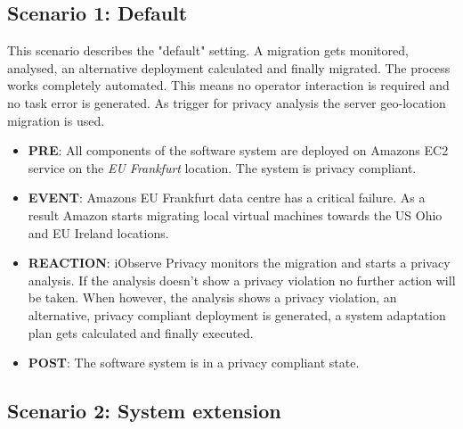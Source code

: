 \subsection{Scenario 1: Default}
\label{eval:scenario:1}
This scenario describes the "default" setting. A migration gets monitored, analysed, an alternative deployment calculated and finally migrated. The process works completely automated. This means no operator interaction is required and no task error is generated. As trigger for privacy analysis the server geo-location migration is used.
\begin{itemize}
	\setlength\itemsep{0em}
	\item \textbf{PRE}: All components of the software system are deployed on Amazons EC2 service on the \textit{EU Frankfurt} location. The system is privacy compliant.
	\item \textbf{EVENT}: Amazons EU Frankfurt data centre has a critical failure. As a result Amazon starts migrating local virtual machines towards the US Ohio and EU Ireland locations.
	\item \textbf{REACTION}: iObserve Privacy monitors the migration and starts a privacy analysis. If the analysis doesn't show a privacy violation no further action will be taken. When however, the analysis shows a privacy violation, an alternative, privacy compliant deployment is generated, a system adaptation plan gets calculated and finally executed.
	\item \textbf{POST}: The software system is in a privacy compliant state.
\end{itemize}


\subsection{Scenario 2: System extension}
\label{eval:scenario:2}


